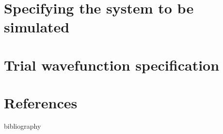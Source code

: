\documentclass[11pt,letterpaper]{report}
\begin{document}

\newpage
\tableofcontents
\newpage

\begin{btUnit}










\chapter{Specifying the system to be simulated}



\chapter{Trial wavefunction specification}











































\chapter*{References}
\begin{btSect}{bibliography}
\btPrintCited
\end{btSect}
\end{btUnit}

\appendix

\begin{btUnit}

\end{btUnit}
\end{document}

